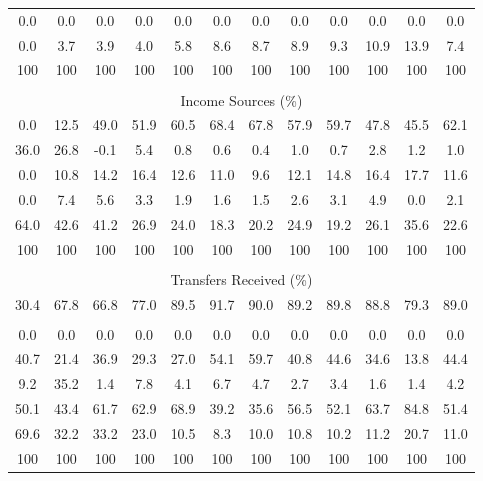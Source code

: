 \begin{tabular}{c c c| c c c c c| c c c| c}
0.0 & 0.0 & 0.0 & 0.0 & 0.0 & 0.0 & 0.0 & 0.0 & 0.0 & 0.0 & 0.0 & 0.0 \\
0.0 & 3.7 & 3.9 & 4.0 & 5.8 & 8.6 & 8.7 & 8.9 & 9.3 & 10.9 & 13.9 & 7.4 \\
\midrule
100 & 100 & 100 & 100 & 100 & 100 & 100 & 100 & 100 & 100 & 100 & 100 \\
\midrule \\
\multicolumn{12}{c}{Income Sources (\%)}  \\
\midrule
0.0 & 12.5 & 49.0 & 51.9 & 60.5 & 68.4 & 67.8 & 57.9 & 59.7 & 47.8 & 45.5 & 62.1 \\
36.0 & 26.8 & -0.1 & 5.4 & 0.8 & 0.6 & 0.4 & 1.0 & 0.7 & 2.8 & 1.2 & 1.0 \\
0.0 & 10.8 & 14.2 & 16.4 & 12.6 & 11.0 & 9.6 & 12.1 & 14.8 & 16.4 & 17.7 & 11.6 \\
0.0 & 7.4 & 5.6 & 3.3 & 1.9 & 1.6 & 1.5 & 2.6 & 3.1 & 4.9 & 0.0 & 2.1 \\
64.0 & 42.6 & 41.2 & 26.9 & 24.0 & 18.3 & 20.2 & 24.9 & 19.2 & 26.1 & 35.6 & 22.6 \\
\midrule
100 & 100 & 100 & 100 & 100 & 100 & 100 & 100 & 100 & 100 & 100 & 100 \\
\midrule \\
\multicolumn{12}{c}{Transfers Received (\%)}  \\
\midrule
30.4 & 67.8 & 66.8 & 77.0 & 89.5 & 91.7 & 90.0 & 89.2 & 89.8 & 88.8 & 79.3 & 89.0 \\
 & & & & & & & & & & &  \\
0.0 & 0.0 & 0.0 & 0.0 & 0.0 & 0.0 & 0.0 & 0.0 & 0.0 & 0.0 & 0.0 & 0.0 \\
40.7 & 21.4 & 36.9 & 29.3 & 27.0 & 54.1 & 59.7 & 40.8 & 44.6 & 34.6 & 13.8 & 44.4 \\
9.2 & 35.2 & 1.4 & 7.8 & 4.1 & 6.7 & 4.7 & 2.7 & 3.4 & 1.6 & 1.4 & 4.2 \\
50.1 & 43.4 & 61.7 & 62.9 & 68.9 & 39.2 & 35.6 & 56.5 & 52.1 & 63.7 & 84.8 & 51.4 \\
69.6 & 32.2 & 33.2 & 23.0 & 10.5 & 8.3 & 10.0 & 10.8 & 10.2 & 11.2 & 20.7 & 11.0 \\
\midrule
100 & 100 & 100 & 100 & 100 & 100 & 100 & 100 & 100 & 100 & 100 & 100 \\
\bottomrule
\end{tabular}